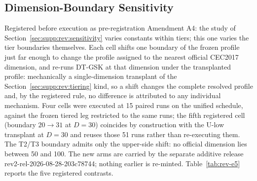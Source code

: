 \documentclass[algorithms,article,submit,moreauthors,pdftex]{Definitions/mdpi}
\newcommand{\dtgsk}{DT-GSK}
\begin{document}
\subsection{Dimension-Boundary Sensitivity}\label{sec:supp:rev:boundary}

Registered before execution as pre-registration Amendment A4: the study of
Section~\ref{sec:supp:rev:sensitivity} varies constants within tiers; this
one varies the tier boundaries themselves.  Each cell shifts one boundary of the frozen
profile just far enough to change the profile assigned to the nearest official
CEC2017 dimension, and re-runs \dtgsk{} at that dimension under the
transplanted profile: mechanically a single-dimension transplant of the
Section~\ref{sec:supp:rev:tiering} kind, so a shift changes the complete
resolved profile and, by the registered rule, no difference is attributed to
any individual mechanism.  Four cells were executed at 15 paired runs on the
unified schedule, against the frozen tiered leg restricted to the same runs;
the fifth registered cell (boundary $20 \to 31$ at $D = 30$) coincides by
construction with the U-low transplant at $D = 30$ and reuses those 51 runs
rather than re-executing them.  The T2/T3 boundary admits only the upper-side
shift: no official dimension lies between 50 and 100.  The new arms are
carried by the separate additive release rev2-rel-2026-08-28-203c78744;
nothing earlier is re-minted.  Table~\ref{tab:rev-e5} reports the five
registered contrasts.

\begin{table}[H]
\caption{Dimension-boundary sensitivity on CEC2017 (E5).  One Holm family
across the five registered boundary contrasts; four cells use 15 paired runs
against the frozen tiered leg restricted to the same runs, and the $20 \to 31$
cell at $D = 30$ reuses the 51 runs of the corresponding transplant; paired
Wilcoxon on
per-function means under the stated $10^{-8}$ tie rule, against the frozen
tiered leg restricted to the same runs; W/T/L counted from the tiered side;
the ordinal column re-ranks the panel with only the \dtgsk{} column
substituted.  $^{\ddagger}$The $20 \to 31$ cell reuses the U-low arm (51
runs).}\label{tab:rev-e5}
\resizebox{\textwidth}{!}{}
\end{table}
\end{document}
